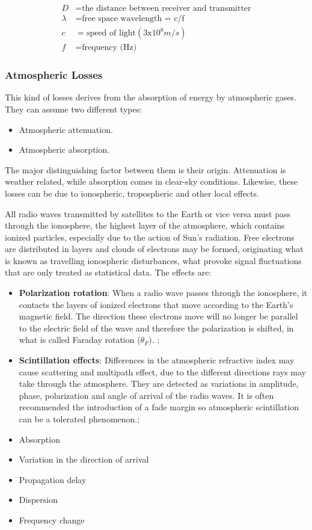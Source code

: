 \begin{align*}
	D&= \text{the distance between receiver and transmitter}\\
	\lambda&= \text{free space wavelength = c/f}\\
	c&= \text{speed of light}(3\mathrm{x}10^8m/s)\\
	f&= \text{frequency (Hz)}
\end{align*}

\subsubsection{Atmospheric Losses}
This kind of losses derives from the absorption of energy by atmospheric gases. They can assume two different types:

\begin{itemize}
	\item Atmospheric attenuation.
	\item Atmospheric absorption.
\end{itemize}

The major distinguishing factor between them is their origin. Attenuation is weather related, while absorption comes in clear-sky conditions.
Likewise, these losses can be due to ionospheric, tropospheric and other local effects. \cite{Jorge2012}

All radio waves transmitted by satellites to the Earth or vice versa must pass through the
ionosphere, the highest layer of the atmosphere, which contains ionized particles,
especially due to the action of Sun's radiation. Free electrons are distributed in layers
and clouds of electrons may be formed, originating what is known as travelling
ionospheric disturbances, what provoke signal fluctuations that are only treated as
statistical data. The effects are:

\begin{itemize}
	\item \textbf{Polarization rotation}: When a radio wave passes through the ionosphere, it contacts the layers of ionized 	electrons that move according to the Earth's magnetic field. The direction these 	electrons move will no longer be parallel to the electric field of the wave and therefore	the polarization is shifted, in what is called Faraday rotation ($\theta_F$). ;
	\item \textbf{Scintillation effects}: Differences in the atmospheric refractive index may cause scattering and multipath 	effect, due to the different directions rays may take through the atmosphere. They are detected as variations in amplitude, phase, polarization and angle of arrival of	the radio waves.	It is often recommended the introduction of a fade margin so atmospheric scintillation
	can be a tolerated phenomenon.; 
	\item Absorption
	\item Variation in the direction of arrival
	\item Propagation delay
	\item Dispersion
	\item Frequency change
\end{itemize}

